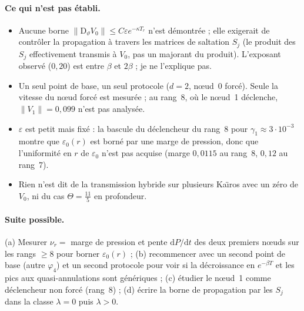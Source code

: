 \documentclass[11pt,a4paper]{article}
\theoremstyle{remark}
\newcommand{\norm}[1]{\lVert #1\rVert}
\newcommand{\vth}{\vartheta}
\newcommand{\D}{\mathrm D}
\begin{document}
\paragraph{Ce qui n'est pas \'etabli.}
\begin{itemize}[nosep]
\item Aucune borne $\norm{\D_\vth V_0}\le C\varepsilon e^{-\kappa T_r}$ n'est d\'emontr\'ee ; elle exigerait de contr\^oler la propagation \`a travers les matrices de saltation $S_j$ (le produit des $S_j$ effectivement transmis \`a $V_0$, pas un majorant du produit). L'exposant observ\'e ($0{,}20$) est entre $\beta$ et $2\beta$ ; je ne l'explique pas.
\item Un seul point de base, un seul protocole ($d=2$, n\oe ud~0 forc\'e). Seule la vitesse du n\oe ud forc\'e est mesur\'ee ; au rang~8, o\`u le n\oe ud~1 d\'eclenche, $\norm{V_1}=0{,}099$ n'est pas analys\'ee.
\item $\varepsilon$ est petit mais fix\'e : la bascule du d\'eclencheur du rang~8 pour $\gamma_1\approx3\cdot10^{-3}$ montre que $\varepsilon_0(r)$ est born\'e par une marge de pression, donc que l'uniformit\'e en $r$ de $\varepsilon_0$ n'est pas acquise (marge $0{,}0115$ au rang~8, $0{,}12$ au rang~7).
\item Rien n'est dit de la transmission hybride sur plusieurs Ka\"{\i}ros avec un z\'ero de $V_0$, ni du cas $\Theta=\frac{11}5$ en profondeur.
\end{itemize}

\paragraph{Suite possible.} (a) Mesurer $\nu_r=$ marge de pression et pente $\mathrm dP/\mathrm dt$ des deux premiers n\oe uds sur les rangs $\ge8$ pour borner $\varepsilon_0(r)$ ; (b) recommencer avec un second point de base (autre $\varphi_4$) et un second protocole pour voir si la d\'ecroissance en $e^{-\beta T}$ et les pics aux quasi-annulations sont g\'en\'eriques ; (c) \'etudier le n\oe ud~1 comme d\'eclencheur non forc\'e (rang~8) ; (d) \'ecrire la borne de propagation par les $S_j$ dans la classe $\lambda=0$ puis $\lambda>0$.
\end{document}
